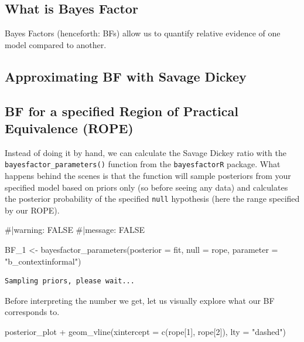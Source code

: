 \documentclass[
  doc,
  longtable,
  nolmodern,
  notxfonts,
  notimes,
  colorlinks=true,linkcolor=blue,citecolor=blue,urlcolor=blue]{apa7}
\newenvironment{Shaded}{\begin{snugshade}}{\end{snugshade}}
\newcommand{\AttributeTok}[1]{\textcolor[rgb]{0.40,0.45,0.13}{#1}}
\newcommand{\CommentTok}[1]{\textcolor[rgb]{0.37,0.37,0.37}{#1}}
\newcommand{\DecValTok}[1]{\textcolor[rgb]{0.68,0.00,0.00}{#1}}
\newcommand{\FunctionTok}[1]{\textcolor[rgb]{0.28,0.35,0.67}{#1}}
\newcommand{\NormalTok}[1]{\textcolor[rgb]{0.00,0.23,0.31}{#1}}
\newcommand{\OtherTok}[1]{\textcolor[rgb]{0.00,0.23,0.31}{#1}}
\newcommand{\SpecialCharTok}[1]{\textcolor[rgb]{0.37,0.37,0.37}{#1}}
\newcommand{\StringTok}[1]{\textcolor[rgb]{0.13,0.47,0.30}{#1}}
\begin{document}
\subsection{What is Bayes Factor}\label{what-is-bayes-factor}

Bayes Factors (henceforth: BFs) allow us to quantify relative evidence
of one model compared to another.

\subsection{Approximating BF with Savage
Dickey}\label{approximating-bf-with-savage-dickey}

\subsection{BF for a specified Region of Practical Equivalence
(ROPE)}\label{bf-for-a-specified-region-of-practical-equivalence-rope}

Instead of doing it by hand, we can calculate the Savage Dickey ratio
with the \texttt{bayesfactor\_parameters()} function from the
\texttt{bayesfactorR} package. What happens behind the scenes is that
the function will sample posteriors from your specified model based on
priors only (so before seeing any data) and calculates the posterior
probability of the specified \texttt{null} hypothesis (here the range
specified by our ROPE).

\begin{Shaded}
\begin{Highlighting}[]
\CommentTok{\#|warning: FALSE}
\CommentTok{\#|message: FALSE}

\NormalTok{BF\_1 }\OtherTok{\textless{}{-}} \FunctionTok{bayesfactor\_parameters}\NormalTok{(}\AttributeTok{posterior =}\NormalTok{ fit, }
                               \AttributeTok{null =}\NormalTok{ rope, }
                               \AttributeTok{parameter =} \StringTok{"b\_contextinformal"}\NormalTok{)}
\end{Highlighting}
\end{Shaded}

\begin{verbatim}
Sampling priors, please wait...
\end{verbatim}

Before interpreting the number we get, let us visually explore what our
BF corresponds to.

\begin{Shaded}
\begin{Highlighting}[]
\NormalTok{posterior\_plot }\SpecialCharTok{+} 
  \FunctionTok{geom\_vline}\NormalTok{(}\AttributeTok{xintercept =} \FunctionTok{c}\NormalTok{(rope[}\DecValTok{1}\NormalTok{], rope[}\DecValTok{2}\NormalTok{]),}
             \AttributeTok{lty =} \StringTok{"dashed"}\NormalTok{)}
\end{Highlighting}
\end{Shaded}
\end{document}
